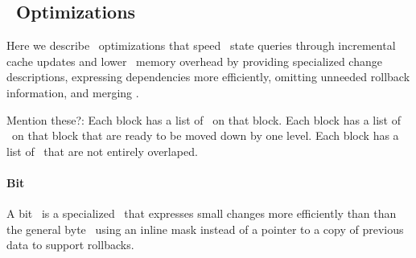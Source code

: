 



\subsection{\ChDesc\ Optimizations}
\label{sec:design:chdesc-opts}

Here we describe \chdesc\ optimizations that speed \chdesc\ state
queries through incremental cache updates
%
and lower \chdesc\ memory overhead by
%
providing specialized change descriptions,
%
expressing dependencies more efficiently,
%
omitting unneeded rollback information,
%
and merging \chdescs.

Mention these?:
%
Each block has a list of \chdescs\ on that block.
%
Each block has a list of \chdescs\ on that block that are ready to be
moved down by one level.
%
Each block has a list of \chdescs\ that are not entirely overlaped.

\paragraph{Bit \ChDescs}
\label{sec:design:chdescs:bit}
A bit \chdesc\ is a specialized \chdesc\ that expresses small changes
more efficiently than than the general byte \chdesc\, using an inline
mask instead of a pointer to a copy of previous data to support rollbacks.

